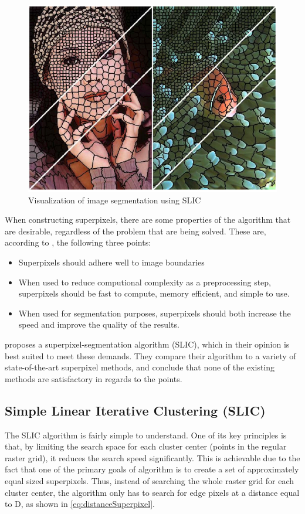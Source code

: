 \begin{figure}[!h]
	\centering
	\includegraphics[scale=0.3]{fig/superpixels}
	\caption{Visualization of image segmentation using SLIC \citep{Achanta2012}}
	\label{fig:superpixels}
\end{figure}

When constructing superpixels, there are some properties of the algorithm that are desirable, regardless of the problem that are being solved. These are, according to \citep{Achanta2012}, the following three points:

\begin{itemize}
	\item Superpixels should adhere well to image boundaries
	\item When used to reduce computional complexity as a preprocessing step, superpixels should be fast to compute, memory efficient, and simple to use.
	\item When used for segmentation purposes, superpixels should both increase the speed and improve the quality of the results.
\end{itemize}

\cite{Achanta2012} proposes a superpixel-segmentation algorithm (SLIC), which in their opinion is best suited to meet these demands. They compare their algorithm to a variety of state-of-the-art superpixel methods, and conclude that none of the existing methods are satisfactory in regards to the points.

\subsection{Simple Linear Iterative Clustering (SLIC)}
The SLIC algorithm is fairly simple to understand. One of its key principles is that, by limiting the search space for each cluster center (points in the regular raster grid), it reduces the search speed significantly. This is achievable due to the fact that one of the primary goals of algorithm is to create a set of approximately equal sized superpixels. Thus, instead of searching the whole raster grid for each cluster center, the algorithm only has to search for edge pixels at a distance equal to D, as shown in \autoref{eq:distanceSuperpixel}.

